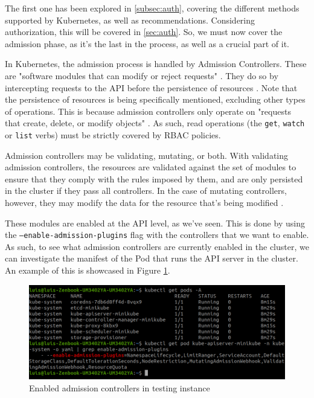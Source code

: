 \documentclass[a4paper,11pt,openright,BCOR=15mm]{scrbook}
\begin{document}
The first one has been explored in \ref{subsec:auth}, covering the different methods supported by Kubernetes, as well as recommendations. Considering authorization, this will be covered in \ref{sec:auth}. So, we must now cover the admission phase, as it's the last in the process, as well as a crucial part of it.

In Kubernetes, the admission process is handled by Admission Controllers. These are "software modules that can modify or reject requests" \cite{the_linux_foundation_controlling_2023}. They do so by intercepting requests to the API before the persistence of resources \cite{the_linux_foundation_admission_2024}. Note that the persistence of resources is being specifically mentioned, excluding other types of operations. This is because admission controllers only operate on "requests that create, delete, or modify objects" \cite{the_linux_foundation_admission_2024}. As such, read operations (the \texttt{get}, \texttt{watch} or \texttt{list} verbs) must be strictly covered by RBAC policies.

Admission controllers may be validating, mutating, or both. With validating admission controllers, the resources are validated against the set of modules to ensure that they comply with the rules imposed by them, and are only persisted in the cluster if they pass all controllers. In the case of mutating controllers, however, they may modify the data for the resource that's being modified \cite{the_linux_foundation_admission_2024}.

These modules are enabled at the API level, as we've seen. This is done by using the \texttt{--enable-admission-plugins} flag with the controllers that we want to enable. As such, to see what admission controllers are currently enabled in the cluster, we can investigate the manifest of the Pod that runs the API server in the cluster. An example of this is showcased in Figure \ref{fig:admission}.

\begin{figure}[h!]
	\centering
	\label{fig:admission}
	\includegraphics[scale=0.5]{figs/enabled-admission.png}
	\caption{Enabled admission controllers in testing instance}
\end{figure}
\end{document}
